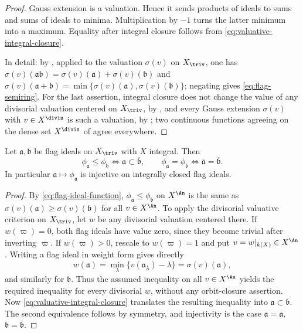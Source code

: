 \begin{proof}
Gauss extension is a valuation.  Hence it sends products of ideals to sums
and sums of ideals to minima.  Multiplication by $-1$ turns the latter
minimum into a maximum.  Equality after integral closure follows from
\eqref{eq:valuative-integral-closure}.

In detail: by , applied to the valuation
$\sigma(v)$ on $X_{\triv}$, one has
$\sigma(v)(\mathfrak a\mathfrak b)
=\sigma(v)(\mathfrak a)+\sigma(v)(\mathfrak b)$ and
$\sigma(v)(\mathfrak a+\mathfrak b)
=\min\{\sigma(v)(\mathfrak a),\sigma(v)(\mathfrak b)\}$; negating gives
\eqref{eq:flag-semiring}.  For the last assertion, integral closure does not
change the value of any divisorial valuation centered on $X_{\triv}$, by
, and every Gauss extension
$\sigma(v)$ with $v\in X^{\divis}$ is such a valuation, by
; two continuous functions agreeing on the
dense set $X^{\divis}$ of  agree
everywhere.
\end{proof}

\begin{proposition}
\label{prop:ch33-flag-faithful}
Let $\mathfrak a,\mathfrak b$ be flag ideals on $X_{\triv}$ with
$X$ integral.  Then
\begin{equation}
\label{eq:ch33-flag-faithful}
 \phi_{\mathfrak a}\leq\phi_{\mathfrak b}
 \iff \mathfrak a\subset\overline{\mathfrak b},
 \qquad
 \phi_{\mathfrak a}=\phi_{\mathfrak b}
 \iff \overline{\mathfrak a}=\overline{\mathfrak b}.
\end{equation}
In particular $\mathfrak a\mapsto\phi_{\mathfrak a}$ is injective on
integrally closed flag ideals.
\end{proposition}

\begin{proof}
By \eqref{eq:flag-ideal-function}, $\phi_{\mathfrak a}\leq\phi_{\mathfrak b}$
on $X^{\An}$ is the same as
$\sigma(v)(\mathfrak a)\geq\sigma(v)(\mathfrak b)$ for all
$v\in X^{\An}$.  To apply the divisorial valuative criterion on
$X_{\triv}$, let $w$ be any divisorial valuation centered there.  If
$w(\varpi)=0$, both flag ideals have value zero, since they become trivial
after inverting $\varpi$.  If $w(\varpi)>0$, rescale to
$w(\varpi)=1$ and put $v=w|_{k(X)}\in X^{\An}$.  Writing a flag ideal in
weight form gives directly
\[
 w(\mathfrak a)=\min_\lambda
   \{v(\mathfrak a_\lambda)-\lambda\}
 =\sigma(v)(\mathfrak a),
\]
and similarly for $\mathfrak b$.  Thus the assumed inequality on all
$v\in X^{\An}$ yields the required inequality for every divisorial $w$,
without any orbit-closure assertion.  Now
\eqref{eq:valuative-integral-closure} translates the resulting inequality
into $\mathfrak a\subset\overline{\mathfrak b}$.  The second equivalence
follows by symmetry, and injectivity is the case
$\mathfrak a=\overline{\mathfrak a}$,
$\mathfrak b=\overline{\mathfrak b}$.
\end{proof}

